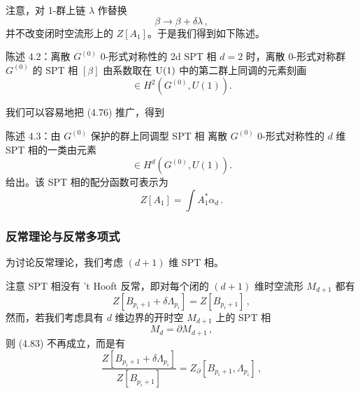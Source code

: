 注意，对 1-群上链 $\lambda$ 作替换
\begin{equation}
\beta\to\beta+\delta\lambda\,,
\tag{4.79}
\end{equation}
并不改变闭时空流形上的 $Z[A_1]$。于是我们得到如下陈述。

\begin{statementbox}{陈述 4.2：离散 $G^{(0)}$ 0-形式对称性的 2d SPT 相}
$d=2$ 时，离散 0-形式对称群 $G^{(0)}$ 的 SPT 相 $[\beta]$ 由系数取在 $\mathrm{U}(1)$ 中的第二群上同调的元素刻画
\begin{equation}
[\beta]\in H^2\left(G^{(0)},U(1)\right).
\tag{4.80}
\end{equation}
\end{statementbox}


我们可以容易地把 (4.76) 推广，得到

\begin{statementbox}{陈述 4.3：由 $G^{(0)}$ 保护的群上同调型 SPT 相}
离散 $G^{(0)}$ 0-形式对称性的 $d$ 维 SPT 相的一类由元素
\begin{equation}
[\alpha_d]\in H^d\left(G^{(0)},U(1)\right).
\tag{4.81}
\end{equation}
给出。该 SPT 相的配分函数可表示为
\begin{equation}
Z[A_1]=\int A_1^*\alpha_d\,.
\tag{4.82}
\end{equation}
\end{statementbox}

\subsubsection{反常理论与反常多项式}

为讨论反常理论，我们考虑 $(d+1)$ 维 SPT 相。

注意 SPT 相没有 't Hooft 反常，即对每个闭的 $(d+1)$ 维时空流形 $M_{d+1}$ 都有
\begin{equation}
Z[B_{p_i+1}+\delta\Lambda_{p_i}]=Z[B_{p_i+1}]\,,
\tag{4.83}
\end{equation}
然而，若我们考虑具有 $d$ 维边界的开时空 $M_{d+1}$ 上的 SPT 相
\begin{equation}
M_d=\partial M_{d+1}\,,
\tag{4.84}
\end{equation}
则 (4.83) 不再成立，而是有
\begin{equation}
\frac{Z[B_{p_i+1}+\delta\Lambda_{p_i}]}{Z[B_{p_i+1}]}=Z_\partial[B_{p_i+1},\Lambda_{p_i}]\,,
\tag{4.85}
\end{equation}

